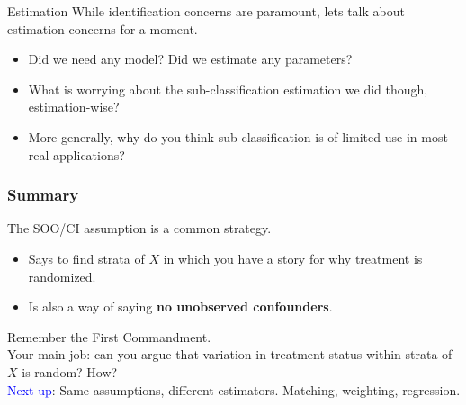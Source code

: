 \documentclass[xcolor=dvipsnames]{beamer}
\newcommand\makebiggaps{\addtolength{\itemsep}{.5\baselineskip}}
\begin{document}
\begin{frame}{Estimation}
 While identification concerns are paramount, lets talk about estimation concerns for a moment. \\
\small
\begin{itemize}
\item<1-> Did we need any model? Did we estimate any parameters? \\
\medskip
\item<2-> What is worrying about the sub-classification estimation we did though, estimation-wise?\\
\medskip
\item<3->  More generally, why do you think sub-classification is of limited use in most real applications? 
\end{itemize}
\end{frame}


\begin{frame}
\frametitle{Summary}
The SOO/CI assumption is a common strategy.  \\
\footnotesize
\begin{itemize}
\makebiggaps
\item<2->  Says to find strata of $X$ in which you have a story for why treatment is randomized.
\item<3-> Is also a way of saying \textbf{no unobserved confounders}.
\end{itemize}
\normalsize
{} Remember the First Commandment.\\
\bigskip
{} Your main job: can you argue that variation in treatment status within strata of $X$ is random? How?\\
\bigskip
{} \textcolor{Blue}{Next up}: Same assumptions, different estimators. Matching, weighting, regression.
\end{frame}
\end{document}
